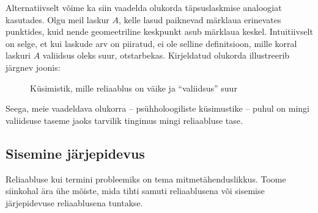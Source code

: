 \documentclass[a4paper,12pt,oneside]{article}
\newenvironment{naide}{
    \begin{lrbox}{\boxTwo}
        \begin{minipage}{\textwidth}
    }
    {\end{minipage}\end{lrbox}
    	\colorbox{background_example}{\usebox{\boxTwo}}
    }
\numberwithin{equation}{section}
\theoremstyle{definition}
\begin{document}
Alternatiivselt võime ka siin vaadelda olukorda  täpsuslaskmise analoogiat kasutades. Olgu meil laskur $A$, kelle lasud paiknevad märklaua erinevates punktides, kuid nende geomeetriline keskpunkt asub märklaua keskel. Intuitiivselt on selge, et kui laskude arv on piiratud, ei ole selline definitsioon, mille korral laskuri $A$ valiidsus oleks suur, otstarbekas. Kirjeldatud olukorda illustreerib järgnev joonis:


\begin{figure}[H]
\begin{naide}
\end{naide}
\caption{Küsimistik, mille reliaablus on väike ja "`valiidsus"' suur}
\end{figure}
 

Seega, meie vaadeldava olukorra -- psühholoogiliste küsimustike -- puhul on mingi valiidsuse taseme jaoks tarvilik tingimus mingi reliaabluse tase.    


\subsection{Sisemine järjepidevus}

Reliaabluse kui termini probleemiks on tema mitmetähenduslikkus. Toome siinkohal ära ühe mõiste,  mida tihti samuti reliaablusena või sisemise järjepidevuse reliaablusena tuntakse.
\end{document}
